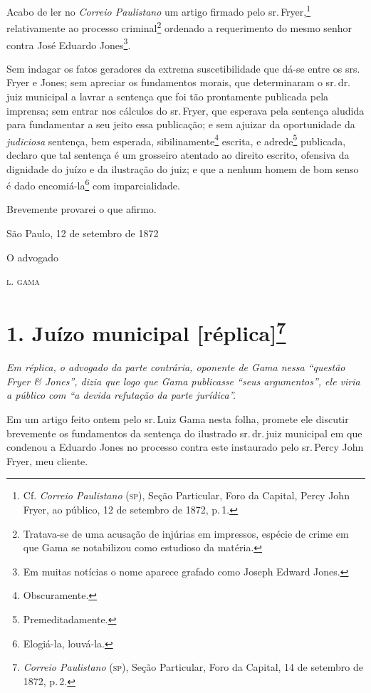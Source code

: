 Acabo de ler no \emph{Correio Paulistano} um artigo firmado pelo sr.\,Fryer,\footnote{ Cf. \emph{Correio Paulistano} (\textsc{sp}), Seção Particular,
  Foro da Capital, Percy John Fryer, ao público, 12 de setembro de 1872, p.\,1.}
relativamente ao processo criminal\footnote{ Tratava-se de uma acusação
  de injúrias em impressos, espécie de crime em que Gama se notabilizou
  como estudioso da matéria.} ordenado a requerimento do mesmo senhor
contra José Eduardo Jones\footnote{ Em muitas notícias o nome aparece
  grafado como Joseph Edward Jones.}.

Sem indagar os fatos geradores da extrema suscetibilidade que dá-se
entre os srs. Fryer e Jones; sem apreciar os fundamentos morais, que
determinaram o sr.\,dr.\,juiz municipal a lavrar a sentença que foi tão
prontamente publicada pela imprensa; sem entrar nos cálculos do sr.\,Fryer, que esperava pela sentença aludida para fundamentar a seu jeito
essa publicação; e sem ajuizar da oportunidade da \emph{judiciosa}
sentença, bem esperada, sibilinamente\footnote{ Obscuramente.} escrita,
e adrede\footnote{ Premeditadamente.} publicada, declaro que tal
sentença é um grosseiro atentado ao direito escrito, ofensiva da
dignidade do juízo e da ilustração do juiz; e que a nenhum homem de bom
senso é dado encomiá-la\footnote{ Elogiá-la, louvá-la.} com
imparcialidade.

Brevemente provarei o que afirmo.

\begin{flushright}
São Paulo, 12 de setembro de 1872

O advogado

\textsc{l. gama}
\end{flushright}

\chapter{1. Juízo municipal {[}réplica{]}\footnote{\emph{Correio Paulistano} (\textsc{sp}), Seção Particular, Foro
  da Capital, 14 de setembro de 1872, p.\,2.}} %

\begin{didascalia}
\emph{Em réplica, o advogado da parte contrária, oponente de Gama nessa
``questão Fryer \& Jones'', dizia que logo que Gama publicasse ``seus
argumentos'', ele viria a público com ``a devida refutação da parte
jurídica''.}
\end{didascalia}

Em um artigo feito ontem pelo sr.\,Luiz Gama nesta folha, promete ele
discutir brevemente os fundamentos da sentença do ilustrado sr.\,dr.\,juiz
municipal em que condenou a Eduardo Jones no processo contra este
instaurado pelo sr.\,Percy John Fryer, meu cliente.

